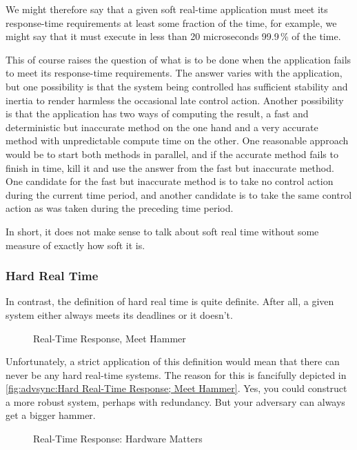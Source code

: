 We might therefore say that a given soft real-time application must meet
its response-time requirements at least some fraction of the time, for
example, we might say that it must execute in less than 20 microseconds
99.9\,\% of the time.

This of course raises the question of what is to be done when the application
fails to meet its response-time requirements.
The answer varies with the application, but one possibility
is that the system being controlled has sufficient stability and inertia
to render harmless the occasional late control action.
Another possibility is that the application has two ways of computing
the result, a fast and deterministic but inaccurate method on the
one hand and
a very accurate method with unpredictable compute time on the other.
One reasonable approach would be to start
both methods in parallel, and if the accurate method fails to finish
in time, kill it and use the answer from the fast but inaccurate method.
One candidate for the fast but inaccurate method is to take
no control action during the current time period, and another candidate is
to take the same control action as was taken during the preceding time
period.

In short, it does not make sense to talk about soft real time without
some measure of exactly how soft it is.

\subsubsection{Hard Real Time}
\label{sec:Hard Real Time}

In contrast, the definition of hard real time is quite definite.
After all, a given system either always meets its deadlines or it
doesn't.

\begin{figure}
\centering
{}
\caption{Real-Time Response, Meet Hammer}
\end{figure}

Unfortunately, a strict application of this definition would mean that
there can never be any hard real-time systems.
The reason for this is fancifully depicted in
\cref{fig:advsync:Hard Real-Time Response; Meet Hammer}.
Yes, you could construct a more robust system, perhaps with redundancy.
But your adversary can always get a bigger hammer.

\begin{figure}
\centering
{}
\caption{Real-Time Response: Hardware Matters}
\end{figure}

